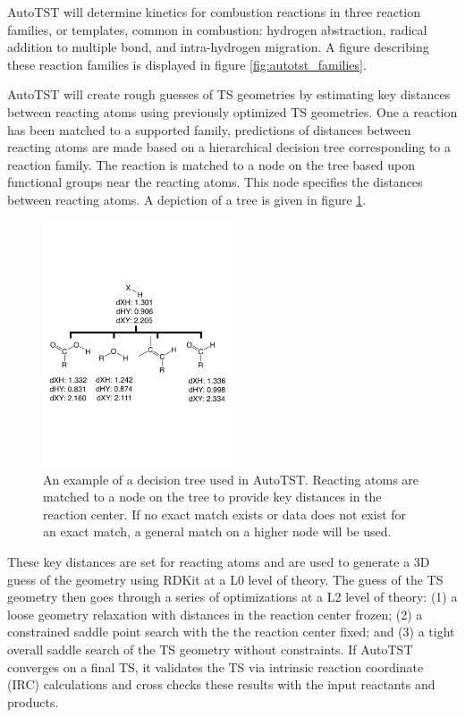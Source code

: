 \documentclass[preprint, 11pt]{elsarticle} %
\begin{document}
AutoTST will determine kinetics for combustion reactions in three reaction families, or templates, common in combustion: hydrogen abstraction, radical addition to multiple bond, and intra-hydrogen migration. 
A figure describing these reaction families is displayed in figure \ref{fig:autotst_families}.

AutoTST will create rough guesses of TS geometries by estimating key distances between reacting atoms using previously optimized TS geometries. 
One a reaction has been matched to a supported family, predictions of distances between reacting atoms are made based on a hierarchical decision tree corresponding to a reaction family.
The reaction is matched to a node on the tree based upon functional groups near the reacting atoms. 
This node specifies the distances between reacting atoms.
A depiction of a tree is given in figure \ref{fig:autotst_tree}.

\begin{figure}[h!]
    \centering
    \includegraphics[width=0.5\textwidth]{autotst_tree}
    \caption{An example of a decision tree used in AutoTST. Reacting atoms are matched to a node on the tree to provide key distances in the reaction center. If no exact match exists or data does not exist for an exact match, a general match on a higher node will be used.}
    \label{fig:autotst_tree}
\end{figure}

These key distances are set for reacting atoms and are used to generate a 3D guess of the geometry using RDKit \cite{RDKit:2018} at a L0 level of theory.
The guess of the TS geometry then goes through a series of optimizations at a L2 level of theory: (1) a loose geometry relaxation with distances in the reaction center frozen; (2) a constrained saddle point search with the the reaction center fixed; and (3) a tight overall saddle search of the TS geometry without constraints.
If AutoTST converges on a final TS, it validates the TS via intrinsic reaction coordinate (IRC) calculations \cite{Fukui:1970} and cross checks these results with the input reactants and products.
\end{document}
